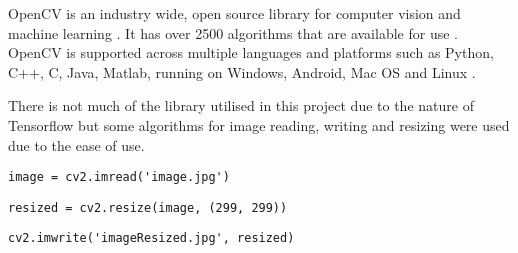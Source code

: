 OpenCV is an industry wide, open source library for computer vision and machine learning \parencite{opencv}.
It has over 2500 algorithms that are available for use \parencite{opencv}.
OpenCV is supported across multiple languages and platforms such as Python, C++, C, Java, Matlab, running on Windows, Android, Mac OS and Linux \parencite{opencv}.

There is not much of the library utilised in this project due to the nature of Tensorflow but some algorithms for image reading, writing and resizing were used due to the ease of use.

\begin{lstlisting}
image = cv2.imread('image.jpg')
\end{lstlisting}

\begin{lstlisting}
resized = cv2.resize(image, (299, 299))
\end{lstlisting}

\begin{lstlisting}
cv2.imwrite('imageResized.jpg', resized)
\end{lstlisting}
